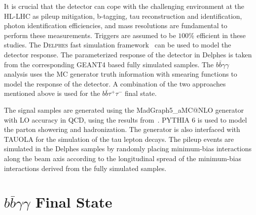 It is crucial that the \phasetwo detector can cope with the challenging environment at the HL-LHC as pileup mitigation, b-tagging, tau reconstruction and identification, photon identification efficiencies, and mass  resolutions are fundamental to perform these measurements. Triggers are assumed to be $100\%$ efficient in these studies. The \textsc{Delphes} fast simulation framework~\cite{deFavereau:2013fsa} can be used to model the \phasetwo detector response. The parameterized response of the \phasetwo detector in Delphes is taken from the corresponding GEANT4 based fully simulated samples. The $b\bar{b}\gamma\gamma$ analysis uses the MC generator truth information with smearing functions to model the response of the detector. A combination of the two approaches mentioned above is used for the $b\bar{b}\tau^{+}\tau^{-}$ final state.  

The signal samples are generated using the MadGraph5\_aMC@NLO generator with LO accuracy in QCD, using the results from~\cite{Frederix2014142}. PYTHIA 6 is used to model the parton showering and hadronization. The generator is also interfaced with TAUOLA for the simulation of the tau lepton decays. The pileup events are simulated in the Delphes samples by randomly placing minimum-bias interactions along the beam axis according to the longitudinal spread of the minimum-bias interactions derived from the fully simulated samples.

\section{$b\bar{b}\gamma\gamma$ Final State}


